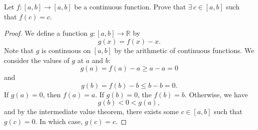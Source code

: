 \documentclass[12pt]{article}
\newenvironment{problem}
    {\begin{lrbox}{\mybox}\begin{minipage}{0.98\textwidth}}
    {\end{minipage}\end{lrbox}\framebox[\textwidth]{\usebox{\mybox}}}
\newcommand{\R}{\mathbb{R}}
\begin{document}
\newpage
\section{}
\begin{problem}
    Let $f:[a,b]\to [a,b]$ be a continuous function. Prove that $\exists\, c \in [a,b]$ such that $f(c) = c$.
\end{problem}

\begin{proof}
    We define a function $g : [a, b] \to \R$ by
    \[
        g(x) = f(x) - x.
    \]
    Note that $g$ is continuous on $[a, b]$ by the arithmetic of continuous functions. We consider the values of $g$ at $a$ and $b$:
    \[
        g(a) = f(a) - a \geq a - a = 0
    \]
    and
    \[
        g(b) = f(b) - b \leq b - b = 0.
    \]
    If $g(a) = 0$, then $f(a) = a$. If $g(b) = 0$, the $f(b) = b$. Otherwise, we have
    \[
        g(b) < 0 < g(a),
    \]
    and by the intermediate value theorem, there exists some $c \in [a, b]$ such that $g(c) = 0$. In which case, $g(c) = c$.
    
\end{proof}
\end{document}
